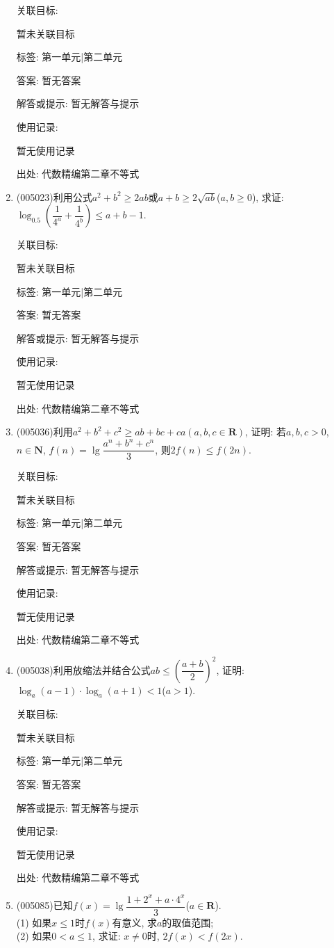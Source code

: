 \documentclass[10pt,a4paper]{article}
\begin{document}
\begin{enumerate}[1.]
关联目标:

暂未关联目标



标签: 第一单元|第二单元

答案: 暂无答案

解答或提示: 暂无解答与提示

使用记录:

暂无使用记录


出处: 代数精编第二章不等式
\item { (005023)}利用公式$a^2+b^2\ge 2ab$或$a+b\ge 2\sqrt{ab}$($a,b\ge 0$), 求证: $\log_{0.5}(\dfrac 1{4^a}+\dfrac 1{4^b})\le a+b-1$.


关联目标:

暂未关联目标



标签: 第一单元|第二单元

答案: 暂无答案

解答或提示: 暂无解答与提示

使用记录:

暂无使用记录


出处: 代数精编第二章不等式
\item { (005036)}利用$a^2+b^2+c^2\ge ab+bc+ca(a,b,c\in \mathbf{R})$, 证明: 若$a,b,c>0$, $n\in \mathbf{N}$, $f(n)=\lg \dfrac{a^n+b^n+c^n}3$, 则$2f(n)\le f(2n)$.


关联目标:

暂未关联目标



标签: 第一单元|第二单元

答案: 暂无答案

解答或提示: 暂无解答与提示

使用记录:

暂无使用记录


出处: 代数精编第二章不等式
\item { (005038)}利用放缩法并结合公式$ab\le (\dfrac{a+b}2)^2$, 证明: $\log_a(a-1)\cdot \log_a(a+1)<1$($a>1$).


关联目标:

暂未关联目标



标签: 第一单元|第二单元

答案: 暂无答案

解答或提示: 暂无解答与提示

使用记录:

暂无使用记录


出处: 代数精编第二章不等式
\item { (005085)}已知$f(x)=\lg \dfrac{1+2^x+a\cdot 4^x}3$($a\in \mathbf{R}$).\\
(1) 如果$x\le 1$时$f(x)$有意义, 求$a$的取值范围;\\
(2) 如果$0<a\le 1$, 求证: $x\ne 0$时, $2f(x)<f(2x)$.



\end{enumerate}
\end{document}
